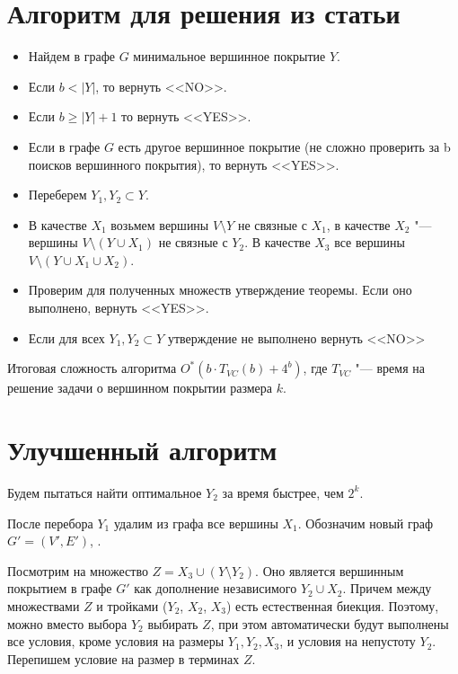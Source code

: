 \documentclass[10pt,a4paper]{article}
\begin{document}
\newpage

\section{Алгоритм для решения из статьи}

\begin{itemize}
\item Найдем в графе $G$ минимальное вершинное покрытие $Y$.
\item Если $b < |Y|$, то вернуть <<NO>>.
\item Если $b \ge |Y| + 1$ то вернуть <<YES>>.
\item Если в графе $G$ есть другое вершинное покрытие (не сложно проверить за b поисков вершинного покрытия),
то вернуть <<YES>>.
\item Переберем $Y_1, Y_2 \subset Y$.
\item В качестве $X_1$ возьмем вершины $V\setminus Y$ не связные с $X_1$, в качестве $X_2$ "--- вершины $V \setminus (Y \cup X_1)$ 
не связные с $Y_2$. В качестве $X_3$ все вершины $V \setminus (Y \cup X_1 \cup X_2)$.
\item Проверим для полученных множеств утверждение теоремы. Если оно выполнено, вернуть <<YES>>.
\item Если для всех $Y_1, Y_2 \subset Y$ утверждение не выполнено вернуть <<NO>>
\end{itemize}

Итоговая сложность алгоритма $O^*(b\cdot T_{VC}(b) + 4^b)$, где $T_{VC}$ "--- время на решение задачи о вершинном покрытии размера $k$.

\section{Улучшенный алгоритм}

Будем пытаться найти оптимальное $Y_2$ за время быстрее, чем $2^{k}$.

После перебора $Y_1$ удалим из графа все вершины $X_1$.
Обозначим новый граф $G' = (V', E')$, .

Посмотрим на множество $Z = X_3 \cup (Y \setminus Y_2)$.
Оно является вершинным покрытием в графе $G'$ как дополнение 
независимого $Y_2 \cup X_2$. Причем между множествами $Z$ и тройками 
($Y_2$, $X_2$, $X_3$) есть естественная биекция.
Поэтому, можно вместо выбора $Y_2$ выбирать $Z$, при этом
автоматически будут выполнены все условия, кроме условия на размеры $Y_1, Y_2, X_3$,
и условия на непустоту $Y_2$.
Перепишем условие на размер в терминах $Z$.
\end{document}
